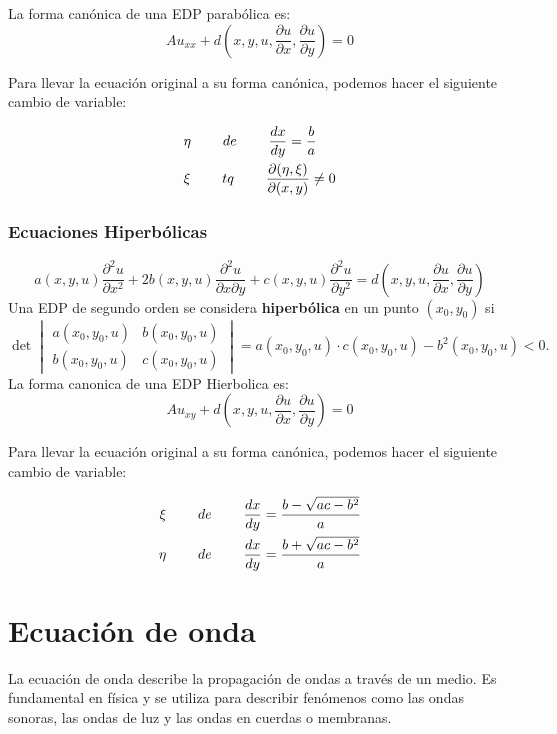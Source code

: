\documentclass[11pt]{book}
\theoremstyle{plain}
\theoremstyle{definition}
\begin{document}
La forma canónica de una EDP parabólica es:
$$A u_{xx} + d(x, y, u, \frac{\partial u}{\partial x}, \frac{\partial u}{\partial y}) = 0$$

Para llevar la ecuación original a su forma canónica, podemos hacer el siguiente cambio de variable:

\begin{align}
    &\eta \hspace{8mm}de\hspace{8mm} \frac{dx}{dy} = \frac{b}{a} \\
    &\xi \hspace{8mm}tq\hspace{8mm} \frac{\partial(\eta, \xi)}{\partial(x,y)} \neq 0
\end{align}
\subsection{Ecuaciones Hiperbólicas}
\setcounter{equation}{0}
\begin{equation}
a(x, y, u) \frac{\partial^2 u}{\partial x^2} + 2 b(x, y, u) \frac{\partial^2 u}{\partial x \partial y} + c(x, y, u) \frac{\partial^2 u}{\partial y^2} = d(x, y, u, \frac{\partial u}{\partial x}, \frac{\partial u}{\partial y})
\end{equation}
Una EDP de segundo orden se considera \textbf{hiperbólica} en un punto $(x_0, y_0)$ si 
\[
\det
\begin{vmatrix}
a(x_0, y_0, u) & b(x_0, y_0, u) \\
b(x_0, y_0, u) & c(x_0, y_0, u)
\end{vmatrix}
= a(x_0, y_0, u) \cdot c(x_0, y_0, u) - b^2(x_0, y_0, u) < 0
.\]
La forma canonica de una EDP Hierbolica es:
$$A u_{xy} + d(x, y, u, \frac{\partial u}{\partial x}, \frac{\partial u}{\partial y}) = 0$$

Para llevar la ecuación original a su forma canónica, podemos hacer el siguiente cambio de variable:

\begin{align}
    \xi \hspace{8mm}de\hspace{8mm} \frac{dx}{dy} &= \frac{b - \sqrt{ac-b^{2}}}{a} \\
    \eta \hspace{8mm}de\hspace{8mm} \frac{dx}{dy} &= \frac{b + \sqrt{ac-b^{2}}}{a}
\end{align}

\newpage
\chapter{Ecuación de onda}
\minitoc
La ecuación de onda describe la propagación de ondas a través de un medio. Es fundamental en física y se utiliza para describir fenómenos como las ondas sonoras, las ondas de luz y las ondas en cuerdas o membranas.
\end{document}
